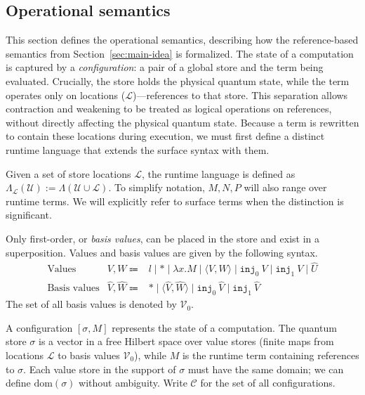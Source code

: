 \subsection{Operational semantics}
This section defines the operational semantics, describing how the reference-based semantics from Section~\ref{sec:main-idea} is formalized.
The state of a computation is captured by a \textit{configuration}: a pair of a global store and the term being evaluated.
Crucially, the store holds the physical quantum state, while the term operates only on locations ($\mathcal{L}$)---references to that store.
This separation allows contraction and weakening to be treated as logical operations on references, without directly affecting the physical quantum state.
Because a term is rewritten to contain these locations during execution, we must first define a distinct runtime language that extends the surface syntax with them.

\begin{dfn}
  Given a set of store locations $\mathcal{L}$, the runtime language is defined as $\Lambda_\mathcal{L}(\mathcal{U}) := \Lambda(\mathcal{U}\cup\mathcal{L})$.
  To simplify notation, $M, N, P$ will also range over runtime terms.
  We will explicitly refer to surface terms when the distinction is significant.
\end{dfn}

Only first-order, or \textit{basis values}, can be placed in the store and exist in a superposition.
Values and basis values are given by the following syntax.
\begin{equation*}
  \begin{array}{lrl}
    \text{Values}       & V, W \Coloneqq             & l \mid *\mid\lambda x. M\mid\langle V, W\rangle\mid\texttt{inj}_0\ V\mid\texttt{inj}_1\ V\mid\hat{U} \\
    \text{Basis values} & \hat{V}, \hat{W} \Coloneqq & *\mid\langle\hat{V}, \hat{W}\rangle\mid\texttt{inj}_0\ \hat{V}\mid\texttt{inj}_1\ \hat{V}
  \end{array}
\end{equation*}
The set of all basis values is denoted by $\mathcal{V}_0$.

A configuration $[\sigma, M]$ represents the state of a computation.
The quantum store $\sigma$ is a vector in a free Hilbert space over value stores (finite maps from locations $\mathcal{L}$ to basis values $\mathcal{V}_0$), while $M$ is the runtime term containing references to $\sigma$.
Each value store in the support of $\sigma$ must have the same domain; we can define $\text{dom}(\sigma)$ without ambiguity.
Write $\mathcal{C}$ for the set of all configurations.


